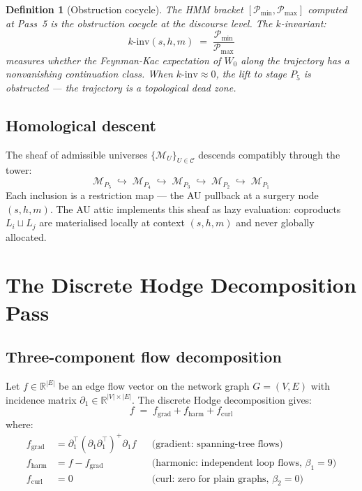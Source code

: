\documentclass[11pt,a4paper]{article}
\newtheorem{definition}[theorem]{Definition}
\newcommand{\Mfld}{\mathcal{M}}
\begin{document}
\begin{definition}[Obstruction cocycle]
The HMM bracket $[\mathcal{P}_{\min}, \mathcal{P}_{\max}]$
computed at Pass~5 is the obstruction cocycle at the discourse
level. The $k$-invariant:
\[
  k\text{-inv}(s,h,m) \;=\; \frac{\mathcal{P}_{\min}}{\mathcal{P}_{\max}}
\]
measures whether the Feynman-Kac expectation of $W_0$ along the
trajectory has a nonvanishing continuation class.
When $k\text{-inv} \approx 0$, the lift to stage $P_5$ is
obstructed --- the trajectory is a topological dead zone.
\end{definition}

\subsection{Homological descent}

The sheaf of admissible universes $\{\Mfld_U\}_{U \in \mathcal{C}}$
descends compatibly through the tower:
\[
  \Mfld_{P_5} \;\hookrightarrow\;
  \Mfld_{P_4} \;\hookrightarrow\;
  \Mfld_{P_3} \;\hookrightarrow\;
  \Mfld_{P_2} \;\hookrightarrow\;
  \Mfld_{P_1}
\]
Each inclusion is a restriction map --- the AU pullback at a
surgery node $(s,h,m)$. The AU attic implements this sheaf as
lazy evaluation: coproducts $L_i \sqcup L_j$ are materialised
locally at context $(s,h,m)$ and never globally allocated.

\section{The Discrete Hodge Decomposition Pass}

\subsection{Three-component flow decomposition}

Let $f \in \mathbb{R}^{|E|}$ be an edge flow vector on the network
graph $G = (V,E)$ with incidence matrix
$\partial_1 \in \mathbb{R}^{|V| \times |E|}$.
The discrete Hodge decomposition gives:
\[
  f \;=\; f_{\mathrm{grad}} + f_{\mathrm{harm}} + f_{\mathrm{curl}}
\]
where:
\begin{align*}
  f_{\mathrm{grad}} &= \partial_1^\top (\partial_1 \partial_1^\top)^+ \partial_1 f
    & &\text{(gradient: spanning-tree flows)} \\
  f_{\mathrm{harm}} &= f - f_{\mathrm{grad}}
    & &\text{(harmonic: independent loop flows, } \beta_1=9\text{)} \\
  f_{\mathrm{curl}} &= 0
    & &\text{(curl: zero for plain graphs, } \beta_2=0\text{)}
\end{align*}
\end{document}
